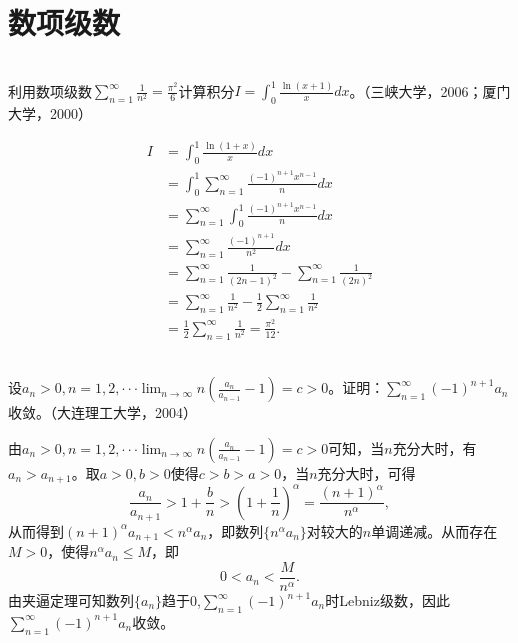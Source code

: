  \section{数项级数}
     \begin{example}
    \hfill\\
    利用数项级数$\displaystyle\sum_{n=1}^{\infty}\frac 1{n^2}=\frac{\pi^2}6$计算积分$I=\int_0^1\frac{\ln(x+1)}xdx$。（三峡大学，2006；厦门大学，2000）
    
    
     \begin{equation}
  \begin{aligned}
  I&=\int_0^1\frac{\ln(1+x)}{x}dx\\
  &=\int_0^1\sum_{n=1}^{\infty}\frac{(-1)^{n+1}x^{n-1}}{n}dx\\
  &=\sum_{n=1}^{\infty}\int_0^1\frac{(-1)^{n+1}x^{n-1}}{n}dx\\
  &=\sum_{n=1}^{\infty}\frac{(-1)^{n+1}}{n^2}dx\\
  &=\sum_{n=1}^{\infty}\frac{1}{(2n-1)^2}-\sum_{n=1}^{\infty}\frac{1}{(2n)^2}\\
  &=\sum_{n=1}^{\infty}\frac{1}{n^2}-\frac{1}{2}\sum_{n=1}^{\infty}\frac{1}{n^2}\\
  &=\frac{1}{2}\sum_{n=1}^{\infty}\frac{1}{n^2}=\frac{\pi^2}{12}.
  \end{aligned}
  \end{equation} 
    
    \end{example} 
    \begin{example}
    \hfill\\
    设$\displaystyle a_n>0,n=1,2,\cdot\cdot\cdot\lim_{n\rightarrow\infty}n(\frac{a_n}{a_{n-1}}-1)=c>0$。证明：$\displaystyle\sum_{n=1}^{\infty}(-1)^{n+1}a_n$收敛。（大连理工大学，2004）  
    
    
   由$\displaystyle a_n>0,n=1,2,\cdot\cdot\cdot\lim_{n\rightarrow\infty}n(\frac{a_n}{a_{n-1}}-1)=c>0$可知，当$n$充分大时，有$a_n>a_{n+1}$。取$a>0,b>0$使得$c>b>a>0$，当$n$充分大时，可得$$\frac{a_n}{a_{n+1}}>1+\frac{b}{n}>(1+\frac{1}{n})^{\alpha}=\frac{(n+1)^{\alpha}}{n^{\alpha}},$$
  从而得到$(n+1)^{\alpha}a_{n+1}<n^{\alpha}a_n$，即数列$\{n^{\alpha}a_n\}$对较大的$n$单调递减。从而存在$M>0$，使得$n^{\alpha}a_n\leq M$，即$$0<a_n<\frac{M}{n^{\alpha}}.$$
  由夹逼定理可知数列$\{a_n\}$趋于0,$\sum_{n=1}^{\infty}(-1)^{n+1}a_n$时Lebniz级数，因此$\sum_{n=1}^{\infty}(-1)^{n+1}a_n$收敛。   
    
    \end{example}  
